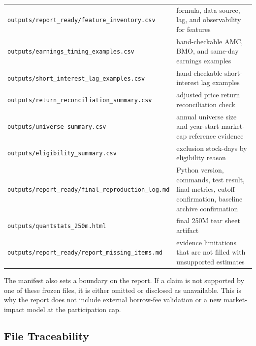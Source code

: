 \documentclass[
]{article}
\begin{document}
\begin{longtable}[]{@{}ll@{}}
\texttt{outputs/report\_ready/feature\_inventory.csv} & formula, data
source, lag, and observability for features \\
\texttt{outputs/earnings\_timing\_examples.csv} & hand-checkable AMC,
BMO, and same-day earnings examples \\
\texttt{outputs/short\_interest\_lag\_examples.csv} & hand-checkable
short-interest lag examples \\
\texttt{outputs/return\_reconciliation\_summary.csv} & adjusted price
return reconciliation check \\
\texttt{outputs/universe\_summary.csv} & annual universe size and
year-start market-cap reference evidence \\
\texttt{outputs/eligibility\_summary.csv} & exclusion stock-days by
eligibility reason \\
\texttt{outputs/report\_ready/final\_reproduction\_log.md} & Python
version, commands, test result, final metrics, cutoff confirmation,
baseline archive confirmation \\
\texttt{outputs/quantstats\_250m.html} & final 250M tear sheet
artifact \\
\texttt{outputs/report\_ready/report\_missing\_items.md} & evidence
limitations that are not filled with unsupported estimates \\
\bottomrule
\end{longtable}

The manifest also sets a boundary on the report. If a claim is not
supported by one of these frozen files, it is either omitted or
disclosed as unavailable. This is why the report does not include
external borrow-fee validation or a new market-impact model at the
participation cap.

\hypertarget{file-traceability}{%
\subsection{File Traceability}\label{file-traceability}}
\end{document}
